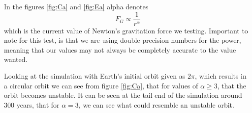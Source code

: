 \documentclass[%
reprint,
nofootinbib,
amsmath,amssymb,
aps,
]{revtex4-1}
\begin{document}
In the figures \ref{fig:Ca} and \ref{fig:Ea} alpha denotes 
\begin{equation}
	F_G \propto \frac{1}{r^{\alpha}}
\end{equation}
which is the current value of Newton's gravitation force we testing. 
Important to note for this test, is that we are using double precision numbers for the power, meaning that our values may not always be completely accurate to the value wanted.

Looking at the simulation with Earth's initial orbit given as $2\pi$, which results in a circular orbit we can see from figure \ref{fig:Ca}, that for values of $\alpha \geq 3$, that the orbit becomes unstable. It can be seen at the tail end of the simulation around 300 years, that for $\alpha = 3$, we can see what could resemble an unstable orbit.  
\end{document}
